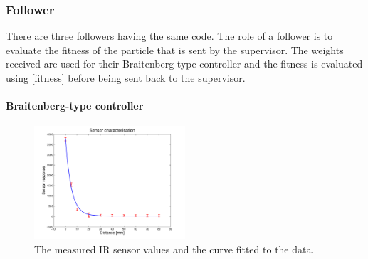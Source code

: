 \documentclass[a4paper, 10pt, conference]{ieeeconf}      %
\begin{document}
\subsubsection{Follower}
There are three followers having the same code. The role of a follower is to evaluate the fitness of the particle that is sent by the supervisor. The weights received are used for their Braitenberg-type controller and the fitness is evaluated using \ref{fitness} before being sent back to the supervisor.

\paragraph{Braitenberg-type controller}

\begin{figure}[thpb]
      \centering
      \includegraphics[width = 0.5\textwidth]{images/sensor.pdf}
      \caption{The measured IR sensor values and the curve fitted to the data.}
      \label{fig:regression}
\end{figure}
\end{document}
